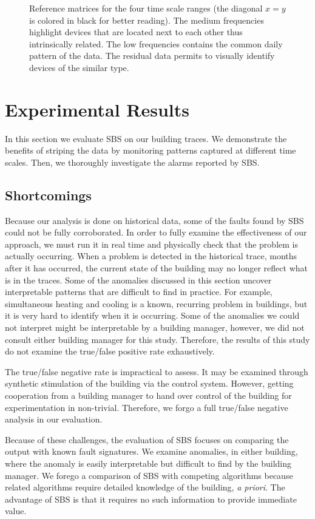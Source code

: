 \begin{figure}[t!]
\caption{Reference matrices for the four time scale ranges (the diagonal $x=y$ is colored in black for better reading). The medium frequencies highlight devices that are located next to each other thus intrinsically related. The low frequencies contains the common daily pattern of the data. The residual data permits to visually identify devices of the similar type.}
\label{fig:heatmap}
\end{figure}

\section{Experimental Results}
\label{eval}
In this section we evaluate SBS on our building traces.  We demonstrate
 the benefits of striping the data by monitoring patterns captured at different time scales.
Then, we thoroughly investigate the alarms reported by SBS.  

\subsection{Shortcomings}
Because our analysis is done on historical data, some of the faults found by SBS could not be fully
corroborated.  In order to fully examine the effectiveness of our approach, we must run it in real time and
physically check that the problem is actually occurring.  When a problem is detected
in the historical trace, months after it has occurred, the current state of the building may no longer reflect
what is in the traces.  Some of the anomalies discussed in this section uncover interpretable patterns 
that are difficult to find in practice.  For example, simultaneous heating and cooling is a known, recurring problem
 in buildings, but it is very hard to identify  when it is occurring.  Some of the anomalies we could not interpret
might be interpretable by a building manager, however, we did not consult either building manager for this study.
Therefore, the results of this study do not examine the true/false positive rate exhaustively.

The true/false negative rate is impractical to assess.  It may be examined through synthetic stimulation of
the building via the control system.  However, getting cooperation from a building manager to hand over control of the building
for experimentation in non-trivial.  Therefore, we forgo a full true/false negative analysis in our evaluation.

Because of these challenges, the evaluation of SBS focuses on comparing the output with known fault
signatures.  We examine anomalies, in either building, where the anomaly is easily interpretable but
difficult to find by the building manager.  We forego a comparison of SBS with competing algorithms because
 related algorithms require detailed knowledge of the building, \emph{a priori}.  The advantage of SBS is that it 
requires no such information to provide immediate value.

